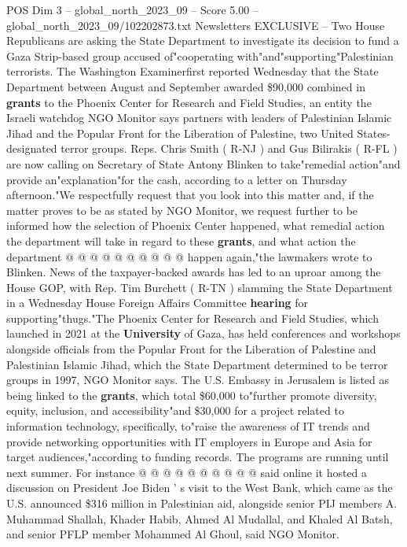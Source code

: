 \begin{textsample}{POS Dim 3 – global\_north\_2023\_09 – Score 5.00 – global\_north\_2023\_09/102202873.txt}  \label{ex:f3_pos_050}
Newsletters EXCLUSIVE -- Two House Republicans are asking the State Department to investigate its decision to fund a Gaza Strip-based group accused of"cooperating with"and"supporting"Palestinian terrorists.
The Washington Examinerfirst reported Wednesday that the State Department between August and September awarded \$90,000 combined in \textbf{grants} to the Phoenix Center for Research and Field Studies, an entity the Israeli watchdog NGO Monitor says partners with leaders of Palestinian Islamic Jihad and the Popular Front for the Liberation of Palestine, two United States-designated terror groups.
Reps.
Chris Smith ( R-NJ ) and Gus Bilirakis ( R-FL ) are now calling on Secretary of State Antony Blinken to take"remedial action"and provide an"explanation"for the cash, according to a letter on Thursday afternoon."We respectfully request that you look into this matter and, if the matter proves to be as stated by NGO Monitor, we request further to be informed how the selection of Phoenix Center happened, what remedial action the department will take in regard to these \textbf{grants}, and what action the department @ @ @ @ @ @ @ @ @ @ happen again,"the lawmakers wrote to Blinken.
News of the taxpayer-backed awards has led to an uproar among the House GOP, with Rep.
Tim Burchett ( R-TN ) slamming the State Department in a Wednesday House Foreign Affairs Committee \textbf{hearing} for supporting"thugs."The Phoenix Center for Research and Field Studies, which launched in 2021 at the \textbf{University} of Gaza, has held conferences and workshops alongside officials from the Popular Front for the Liberation of Palestine and Palestinian Islamic Jihad, which the State Department determined to be terror groups in 1997, NGO Monitor says.
The U.S.
Embassy in Jerusalem is listed as being linked to the \textbf{grants}, which total \$60,000 to"further promote diversity, equity, inclusion, and accessibility"and \$30,000 for a project related to information technology, specifically, to"raise the awareness of IT trends and provide networking opportunities with IT employers in Europe and Asia for target audiences,"according to funding records.
The programs are running until next summer.
For instance @ @ @ @ @ @ @ @ @ @ said online it hosted a discussion on President Joe Biden ' s visit to the West Bank, which came as the U.S. announced \$316 million in Palestinian aid, alongside senior PIJ members A.
Muhammad Shallah, Khader Habib, Ahmed Al Mudallal, and Khaled Al Batsh, and senior PFLP member Mohammed Al Ghoul, said NGO Monitor.

\end{textsample}
